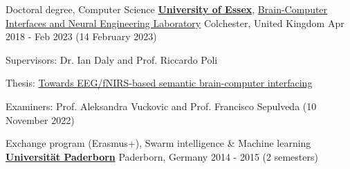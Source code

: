 

\begin{cventries}

  \cventry
    {Doctoral degree, Computer Science} %
    {\href{https://www.essex.ac.uk}{\textbf{University of Essex}}, \href{http://essexbcis.uk}{Brain-Computer Interfaces and Neural Engineering Laboratory}} %
    {Colchester, United Kingdom} %
    {Apr 2018 - Feb 2023 (14 February 2023)} %
    {
      \begin{cvitems} %
        \item {Supervisors: Dr. Ian Daly and Prof. Riccardo Poli}
        \item {Thesis: \href{http://milanrybar.cz/semantic-brain-computer-interfacing}{Towards EEG/fNIRS-based semantic brain-computer interfacing}}
        \item {Examiners: Prof. Aleksandra Vuckovic and Prof. Francisco Sepulveda (10 November 2022)}
      \end{cvitems}
    }

  \cventry
{Exchange program (Erasmus+), Swarm intelligence \& Machine learning} %
{\href{http://www.uni-paderborn.de}{\textbf{Universität Paderborn}}} %
{Paderborn, Germany} %
{2014 - 2015 (2 semesters)} %
{
}


\end{cventries}
